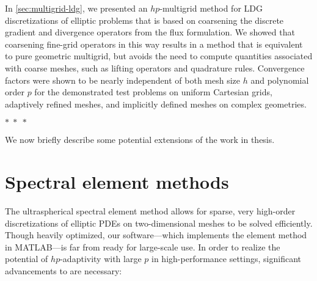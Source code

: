 In \cref{sec:multigrid-ldg}, we presented an $hp$-multigrid method for LDG discretizations of elliptic problems that is based on coarsening the discrete gradient and divergence operators from the flux formulation. We showed that coarsening fine-grid operators in this way results in a method that is equivalent to pure geometric multigrid, but avoids the need to compute quantities associated with coarse meshes, such as lifting operators and quadrature rules. Convergence factors were shown to be nearly independent of both mesh size $h$ and polynomial order $p$ for the demonstrated test problems on uniform Cartesian grids, adaptively refined meshes, and implicitly defined meshes on complex geometries. %

\vspace{0.5em}
\begin{center}$ {\ast}\;{\ast}\;{\ast} $\end{center}
\vspace{0.5em}

\noindent We now briefly describe some potential extensions of the work in thesis.

\section*{Spectral element methods}

The ultraspherical spectral element method allows for sparse, very high-order discretizations of elliptic PDEs on two-dimensional meshes to be solved efficiently. Though heavily optimized, our \ultraSEM software---which implements the element method in MATLAB---is far from ready for large-scale use. In order to realize the potential of $hp$-adaptivity with large $p$ in high-performance settings, significant advancements to \ultraSEM are necessary:

